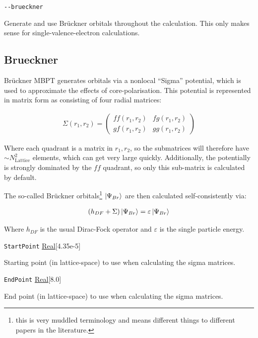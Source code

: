 \documentclass{report}
\begin{document}
\texttt{{-}{-}brueckner}
\begin{adjustwidth}{1cm}{}
Generate and use Br\"{u}ckner orbitals throughout the calculation. This only makes sense for
single-valence-electron calculations.
\end{adjustwidth}

\subsection{Brueckner}

Br\"{u}ckner MBPT generates orbitals via a nonlocal ``Sigma'' potential, which is used to approximate
the effects of core-polarisation. This potential is represented in matrix 
form as consisting of four radial matrices:

\begin{align}
\Sigma(r_1, r_2) = 
\begin{pmatrix}
ff(r_1, r_2)    & fg(r_1, r_2)\\
gf(r_1, r_2)    & gg(r_1, r_2)
\end{pmatrix}
\end{align}

Where each quadrant is a matrix in $r_1, r_2$, so the submatrices will therefore have $\sim
N_{\mathrm{Lattice}}^2$ elements, which can get very large quickly. Additionally, the potentially is
strongly dominated by the $ff$ quadrant, so only this sub-matrix is calculated by default.

The so-called Br\"{u}ckner orbitals\footnote{this is very muddled terminology and 
means different things to different papers in the literature. } $\ket{\Psi_{Br}}$ are then calculated 
self-consistently via:

\begin{align}
\label{eq:brueckner}
(h_{DF} + \Sigma) \ket{\Psi_{Br}} = \varepsilon \ket{\Psi_{Br}}
\end{align}

Where $h_{DF}$ is the usual Dirac-Fock operator and $\varepsilon$ is the single particle energy.

\texttt{StartPoint} \uline{Real}[4.35e-5]
\begin{adjustwidth}{1cm}{}
Starting point (in lattice-space) to use when calculating the sigma matrices.
\end{adjustwidth}

\texttt{EndPoint} \uline{Real}[8.0]
\begin{adjustwidth}{1cm}{}
End point (in lattice-space) to use when calculating the sigma matrices.
\end{adjustwidth}
\end{document}
